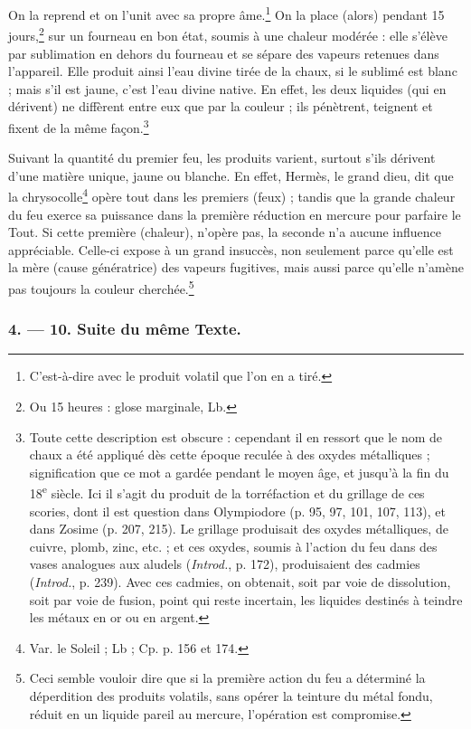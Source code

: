 \documentclass[a4paper, 11pt, oneside, polutonikogreek, french]{article}
\begin{document}
On la reprend et on l'unit avec sa propre âme.\footnote{C'est-à-dire avec le produit volatil que l'on en a tiré.} On la place (alors) pendant 15 jours,\footnote{Ou 15 heures : glose marginale, Lb.} sur un fourneau en bon état, soumis à une chaleur modérée : elle s'élève par sublimation en dehors du fourneau et se sépare des vapeurs retenues dans l'appareil. Elle produit ainsi l'eau divine tirée de la chaux, si le sublimé est blanc ; mais s'il est jaune, c'est l'eau divine native. En effet, les deux liquides (qui en dérivent) ne diffèrent entre eux que par la couleur ; ils pénètrent, teignent et fixent de la même façon.\footnote{Toute cette description est obscure : cependant il en ressort que le nom de chaux a été appliqué dès cette époque reculée à des oxydes métalliques ; signification que ce mot a gardée pendant le moyen âge, et jusqu'à la fin du 18\textsuperscript{e} siècle. Ici il s'agit du produit de la torréfaction et du grillage de ces scories, dont il est question dans Olympiodore (p. 95, 97, 101, 107, 113), et dans Zosime (p. 207, 215). Le grillage produisait des oxydes métalliques, de cuivre, plomb, zinc, etc. ; et ces oxydes, soumis à l'action du feu dans des vases analogues aux aludels (\emph{Introd.}, p. 172), produisaient des cadmies (\emph{Introd.}, p. 239). Avec ces cadmies, on obtenait, soit par voie de dissolution, soit par voie de fusion, point qui reste incertain, les liquides destinés à teindre les métaux en or ou en argent.}

Suivant la quantité du premier feu, les produits varient, surtout s'ils dérivent d'une matière unique, jaune ou blanche. En effet, Hermès, le grand dieu, dit que la chrysocolle\footnote{Var. le Soleil ; Lb ; Cp. p. 156 et 174.} opère tout dans les premiers (feux) ; tandis que la grande chaleur du feu exerce sa puissance dans la première réduction en mercure pour parfaire le Tout. Si cette première (chaleur), n'opère pas, la seconde n'a aucune influence appréciable. Celle-ci expose à un grand insuccès, non seulement parce qu'elle est la mère (cause génératrice) des vapeurs fugitives, mais aussi parce qu'elle n'amène pas toujours la couleur cherchée.\footnote{Ceci semble vouloir dire que si la première action du feu a déterminé la déperdition des produits volatils, sans opérer la teinture du métal fondu, réduit en un liquide pareil au mercure, l'opération est compromise.}
\clearpage
\bigskip
\centerline{\EightStarTaper}
\centerline{\EightStarTaper\EightStarTaper}
\bigskip

\subsubsection{4. --- 10. Suite du même Texte.}
\end{document}
